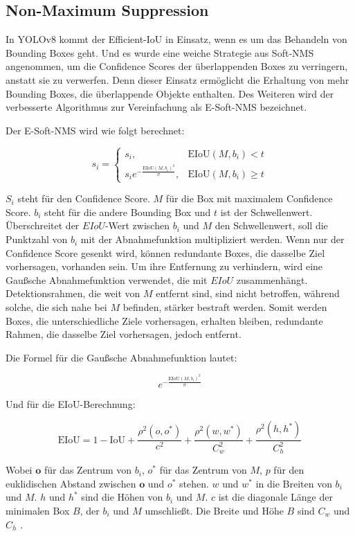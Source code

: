 \documentclass[a4paper,12pt]{article}
\begin{document}
\subsection{Non-Maximum Suppression}

\noindent In YOLOv8 kommt der Efficient-IoU in Einsatz, wenn es um das Behandeln von Bounding Boxes geht. Und es wurde eine weiche Strategie aus Soft-NMS angenommen, um die Confidence Scores der überlappenden Boxes zu verringern, anstatt sie zu verwerfen. Denn dieser Einsatz ermöglicht die Erhaltung von mehr Bounding Boxes, die überlappende Objekte enthalten. Des Weiteren wird der verbesserte Algorithmus zur Vereinfachung als E-Soft-NMS bezeichnet.

\noindent Der E-Soft-NMS wird wie folgt berechnet:

\begin{equation}
    s_i = 
    \begin{cases} 
    s_i, & \text{EIoU}(M, b_i) < t \\
    s_i e^{-\frac{\text{EIoU}(M, b_i)^2}{\sigma}}, & \text{EIoU}(M, b_i) \geq t
    \end{cases}
    \end{equation}

\noindent $S_i$ steht für den Confidence Score. $M$ für die Box mit maximalem Confidence Score. $b_i$ steht für die andere Bounding Box und $t$ ist der Schwellenwert. Überschreitet der $EIoU$-Wert zwischen $b_i$ und $M$ den Schwellenwert, soll die Punktzahl von $b_i$ mit der Abnahmefunktion multipliziert werden. Wenn nur der Confidence Score gesenkt wird, können redundante Boxes, die dasselbe Ziel vorhersagen, vorhanden sein. Um ihre Entfernung zu verhindern, wird eine Gaußsche Abnahmefunktion verwendet, die mit $EIoU$ zusammenhängt. Detektionsrahmen, die weit von $M$ entfernt sind, sind nicht betroffen, während solche, die sich nahe bei $M$ befinden, stärker bestraft werden. Somit werden Boxes, die unterschiedliche Ziele vorhersagen, erhalten bleiben, redundante Rahmen, die dasselbe Ziel vorhersagen, jedoch entfernt.

\noindent Die Formel für die Gaußsche Abnahmefunktion lautet:

\[
e^{-\frac{\text{EIoU}(M, b_i)^2}{\sigma}}
\]

\noindent Und für die EIoU-Berechnung:

\[
\text{EIoU} = 1 - \text{IoU} + \frac{\rho^2(o, o^*)}{c^2} + \frac{\rho^2(w, w^*)}{C_w^2} + \frac{\rho^2(h, h^*)}{C_h^2}
\]

\noindent Wobei $\mathbf{o}$ für das Zentrum von $b_i$, $o^*$ für das Zentrum von $M$, $p$ für den euklidischen Abstand zwischen $\mathbf{o}$ und $o^*$ stehen. $w$ und $w^*$ in die Breiten von $b_i$ und $M$. $h$ und $h^*$ sind die Höhen von $b_i$ und $M$. $c$ ist die diagonale Länge der minimalen Box $B$, der $b_i$ und $M$ umschließt. Die Breite und Höhe $B$ sind $C_w$ und $C_h$ \cite{han2023improving}.
\end{document}
